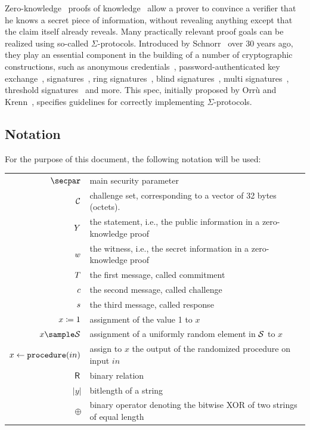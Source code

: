 \documentclass[11pt]{article}
\begin{document}
Zero-knowledge~\cite{GolMicRac89} proofs of knowledge~\cite{C:BelGol92} allow a prover to convince a verifier that he knows a secret piece of information, without revealing anything except that the claim itself already reveals.
Many practically relevant proof goals can be realized using so-called $\Sigma$-protocols.
Introduced by Schnorr~\cite{JC:Schnorr91} over 30 years ago, they play an essential component in the building of a number of cryptographic
constructions,
such as anonymous credentials~\cite{CCS:ChaMeiZav14}, password-authenticated key exchange~\cite{jpake}, signatures~\cite{C:Schnorr89},
ring signatures~\cite{borromeansig}, blind signatures~\cite{CCS:PoiSte97}, multi signatures~\cite{CCS:NRSW20}, threshold signatures~\cite{EPRINT:KomGol20} and more. This spec, initially proposed by Orrù and Krenn~\cite{sigma-proposal}, specifies guidelines for correctly implementing $\Sigma$-protocols.

\subsection{Notation}
\label{sec:notation}

For the purpose of this document, the following notation will be used:

\begin{tabular}{r@{\hspace{1em}}p{11cm}}
    $\secpar$ & main security parameter\\
    $\mathcal{C}$ & challenge set, corresponding to a vector of 32 bytes (octets).\\
    $Y$ & the statement, i.e., the public information in a zero-knowledge proof \\
    $w$ & the witness, i.e., the secret information in a zero-knowledge proof \\
    $T$ & the first message, called commitment \\
    $c$ & the second message, called challenge \\
    $s$ & the third message, called response \\
    $x \coloneqq 1$ & assignment of the value 1 to $x$\\
    $x\sample\someset$ & assignment of a uniformly random element in $\mathcal{S}$ to $x$\\
    $x\gets\texttt{procedure}(in)$ & assign to $x$ the output of the randomized procedure on input $in$\\
    ${\mathsf{R}_{\operatorname{{}}}}$ & binary relation\\
    $|y|$ & bitlength of a string \\
    $\oplus$ & binary operator denoting the bitwise XOR of two strings of equal length
\end{tabular}
\end{document}
